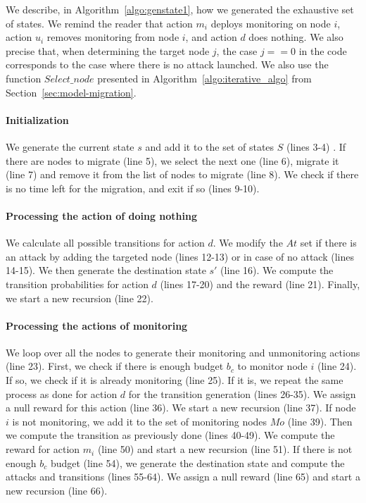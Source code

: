 We describe, in Algorithm~\ref{algo:genstate1}, how we generated the exhaustive set of states.
We remind the reader that action $m_i$ deploys monitoring on node $i$, action $u_i$ removes monitoring from node $i$, and action $d$ does nothing.
We also precise that, when determining the target node $j$, the case $j==0$ in the code corresponds to the case where there is no attack launched.
We also use the function $Select\_node$ presented in Algorithm~\ref{algo:iterative_algo} from Section~\ref{sec:model-migration}.

\paragraph{Initialization}
We generate the current state $s$ and add it to the set of states $S$ (lines 3-4) .
If there are nodes to migrate (line 5), we select the next one (line 6), migrate it (line 7) and remove it from the list of nodes to migrate (line 8).
We check if there is no time left for the migration, and exit if so (lines 9-10).

\paragraph{Processing the action of doing nothing}
We calculate all possible transitions for action $d$.
We modify the $At$ set if there is an attack by adding the targeted node (lines 12-13) or in case of no attack (lines 14-15).
We then generate the destination state $s'$ (line 16).
We compute the transition probabilities for action $d$ (lines 17-20) and the reward (line 21).
Finally, we start a new recursion (line 22).

\paragraph{Processing the actions of monitoring}
We loop over all the nodes to generate their monitoring and unmonitoring actions (line 23).
First, we check if there is enough budget $b_c$ to monitor node $i$ (line 24).
If so, we check if it is already monitoring (line 25).
If it is, we repeat the same process as done for action $d$ for the transition generation (lines 26-35).
We assign a null reward for this action (line 36).
We start a new recursion (line 37).
If node $i$ is not monitoring, we add it to the set of monitoring nodes $Mo$ (line 39).
Then we compute the transition as previously done (lines 40-49).
We compute the reward for action $m_i$ (line 50) and start a new recursion (line 51).
If there is not enough $b_c$ budget (line 54), we generate the destination state and compute the attacks and  transitions (lines 55-64).
We assign a null reward (line 65) and start a new recursion (line 66).

